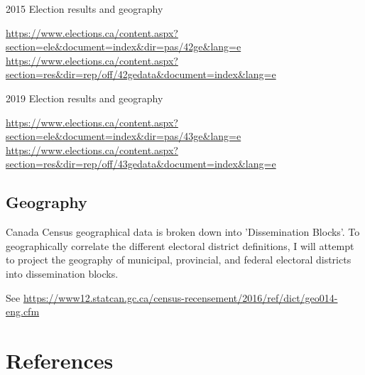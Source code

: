 \documentclass{article}
\begin{document}
2015 Election results and geography

\url{https://www.elections.ca/content.aspx?section=ele&document=index&dir=pas/42ge&lang=e}
\url{https://www.elections.ca/content.aspx?section=res&dir=rep/off/42gedata&document=index&lang=e}

2019 Election results and geography

\url{https://www.elections.ca/content.aspx?section=ele&document=index&dir=pas/43ge&lang=e}
\url{https://www.elections.ca/content.aspx?section=res&dir=rep/off/43gedata&document=index&lang=e}

\subsection{Geography}

Canada Census geographical data is broken down into 'Dissemination Blocks'.  To geographically correlate the different electoral district definitions, I will attempt to project the geography of municipal, provincial, and federal electoral districts into dissemination blocks.

See \url{https://www12.statcan.gc.ca/census-recensement/2016/ref/dict/geo014-eng.cfm}


\section*{References}

\medskip

\small
\end{document}
